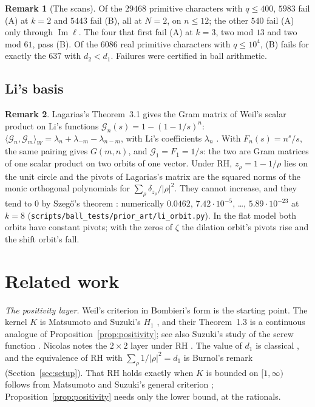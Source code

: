 \documentclass[11pt]{article}
\theoremstyle{definition}
\newtheorem*{remark}{Remark}
\newcommand{\KH}{K}
\begin{document}
\begin{remark}[The scans]
Of the $29468$ primitive characters with $q \le 400$, $5983$ fail (A) at $k = 2$ and $5443$ fail (B), all at $N = 2$,
on $n \le 12$; the other $540$ fail (A) only through
$\operatorname{Im} \ell$. The four that first fail (A) at $k = 3$, two
mod $13$ and two mod $61$, pass (B). Of the $6086$ real
primitive characters with $q \le 10^4$, (B) fails for exactly the
$637$ with $d_2 < d_1$. Failures were certified in ball arithmetic.
\end{remark}

\subsection{Li's basis}\label{sec:li}

\begin{remark}
Lagarias's Theorem~3.1 \cite{lagarias07} gives the Gram matrix of Weil's scalar product on Li's functions $\mathcal
G_n(s) = 1 -
(1 - 1/s)^n$: $\langle \mathcal G_n, \mathcal G_m\rangle_W = \lambda_n + \lambda_{-m} - \lambda_{n - m}$, with Li's
coefficients
$\lambda_n$ \cite{li97}. With $F_n(s) = n^s/s$, the same pairing
gives $G(m, n)$, and $\mathcal G_1 = F_1 = 1/s$: the two are
Gram matrices of one scalar product on two orbits of one vector. Under RH, $z_\rho = 1 - 1/\rho$ lies on the unit
circle and the pivots of Lagarias's matrix are the squared norms of the monic orthogonal polynomials for $\sum_\rho
\delta_{z_\rho}/|\rho|^2$. They cannot increase, and they tend to $0$ by Szeg\H{o}'s theorem \cite[Chapter~2]{simon05}:
numerically $0.0462$,
$7.42 \cdot 10^{-5}$, \dots, $5.89 \cdot 10^{-23}$ at $k = 8$ (\texttt{scripts/ball\_tests/prior\_art/li\_orbit.py}). In
the flat model both orbits have constant pivots; with the zeros of $\zeta$ the dilation orbit's pivots rise and the
shift orbit's fall.
\end{remark}

\section{Related work}\label{sec:related}

\emph{The positivity layer.} Weil's criterion \cite{weil52} in Bombieri's form \cite{bombieri00} is the starting point.
The kernel $\KH$ is Matsumoto and Suzuki's $H_1$ \cite{matsumoto-suzuki}, and their Theorem~1.3 is a continuous
analogue of Proposition~\ref{prop:positivity}; see also Suzuki's study of the screw function \cite{suzuki23}. Nicolas
notes the $2 \times 2$ layer under RH \cite{nicolas}. The value of $d_1$ is classical \cite[Chapter~12]{davenport}, and
the equivalence of RH with $\sum_\rho 1/|\rho|^2 = d_1$ is Burnol's remark (Section~\ref{sec:setup}).
That RH holds exactly when $\KH$ is bounded on $[1, \infty)$ follows from Matsumoto and Suzuki's general criterion
\cite[Corollary~3.1]{matsumoto-suzuki}; Proposition~\ref{prop:positivity} needs only the lower bound, at the
rationals.
\end{document}
